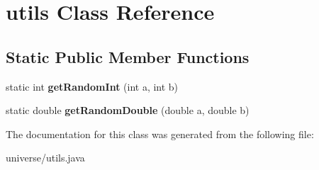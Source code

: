 \hypertarget{classutils}{}\section{utils Class Reference}
\label{classutils}
\subsection*{Static Public Member Functions}
\begin{DoxyCompactItemize}
\item 
static int {\bfseries get\+Random\+Int} (int a, int b)\hypertarget{classutils_a90c4a373ed8738f9b77bdb87ba7c2e0a}{}\label{classutils_a90c4a373ed8738f9b77bdb87ba7c2e0a}

\item 
static double {\bfseries get\+Random\+Double} (double a, double b)\hypertarget{classutils_ae7191c2e1adc22dff90f52c86eb30d99}{}\label{classutils_ae7191c2e1adc22dff90f52c86eb30d99}

\end{DoxyCompactItemize}


The documentation for this class was generated from the following file\+:\begin{DoxyCompactItemize}
\item 
universe/utils.\+java\end{DoxyCompactItemize}
